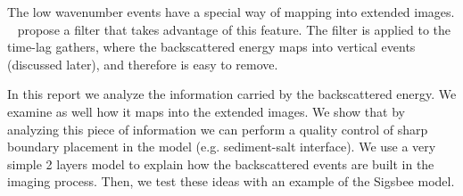 The low wavenumber events have a special way of mapping into extended images. ~\cite{kaelin:3125} propose
a filter that takes advantage of this feature. The filter is applied to the time-lag gathers, where the
backscattered energy maps into vertical events (discussed later), and therefore is easy to remove.

In this report we analyze the information carried by the backscattered energy. We examine as well 
how it maps into the extended images. We show that by analyzing this piece of information we 
can perform a quality control of sharp boundary placement in the model (e.g. sediment-salt interface). 
We use a very simple 2 layers model to explain how the backscattered events are built in the imaging
process. Then, we test these ideas with an example of the Sigsbee model.

 



